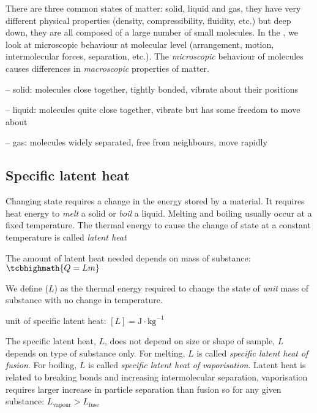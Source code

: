 There are three common states of matter: solid, liquid and gas, they have very different physical properties (density, compressibility, fluidity, etc.) but deep down, they are all composed of a large number of small molecules. In the , we look at microscopic behaviour at molecular level (arrangement, motion, intermolecular forces, separation, etc.). The \emph{microscopic} behaviour of molecules causes differences in \emph{macroscopic} properties of matter.

\begin{compactitem}
	\item[--] solid: molecules close together, tightly bonded, vibrate about their positions
	
	\item[--] liquid: molecules quite close together, vibrate but has some freedom to move about
	
	\item[--] gas: molecules widely separated, free from neighbours, move rapidly
\end{compactitem}

\subsection{Specific latent heat}

Changing state requires a change in the energy stored by a material. It requires heat energy to \emph{melt} a solid or \emph{boil} a liquid. Melting and boiling usually occur at a fixed temperature. The thermal energy to cause the change of state at a constant temperature is called \emph{latent heat}

The amount of latent heat needed depends on mass of substance: $\tcbhighmath{Q=Lm}$

\begin{ilight}
	We define  ($L$) as the thermal energy required to change the state of \emph{unit} mass of substance with no change in temperature.
\end{ilight}


\cmt unit of specific latent heat: $[L] = \text{J}\cdot\text{kg}^{-1}$

The specific latent heat, $L$, does not depend on size or shape of sample, $L$ depends on type of substance only. For melting, $L$ is called \emph{specific latent heat of fusion}. For boiling, $L$ is called \emph{specific latent heat of vaporisation}.
Latent heat is related to breaking bonds and increasing intermolecular separation, vaporisation requires larger increase in particle separation than fusion so for any given substance: $L_\text{vapour}>L_\text{fuse}$


